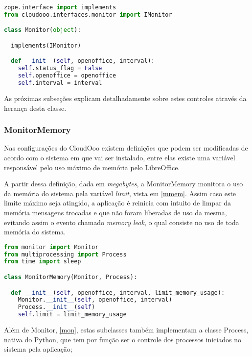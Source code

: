 {\singlespace
\begin{lstlisting}[caption=Inicialização da classe Monitor,language=python,label={monitor}]
zope.interface import implements
from cloudooo.interfaces.monitor import IMonitor

class Monitor(object):

  implements(IMonitor)

  def __init__(self, openoffice, interval):
    self.status_flag = False
    self.openoffice = openoffice
    self.interval = interval

\end{lstlisting}
}

As próximas subseções explicam detalhadamente sobre estes controles através da herança desta classe.

\subsubsection{MonitorMemory}
\label{monitormem}

Nas configurações do CloudOoo existem definições que podem ser modificadas de acordo com o sistema em que vai ser instalado, entre elas existe uma variável responsável pelo uso máximo de memória pelo LibreOffice.

A partir dessa definição, dada em \textit{megabytes}, a MonitorMemory monitora o uso da memória do sistema pela variável \textit{limit}, vista em \ref{mmem}. Assim caso este limite máximo seja atingido, a aplicação é reinicia com intuito de limpar da memória mensagens trocadas e que não foram liberadas de uso da mesma, evitando assim o evento chamado \textit{memory leak}, o qual consiste no uso de toda memória do sistema.

{\singlespace
\begin{lstlisting}[caption=Trecho de criação da classe MonitorMemory,language=python,label={mmem}]
from monitor import Monitor
from multiprocessing import Process
from time import sleep

class MonitorMemory(Monitor, Process):

  def __init__(self, openoffice, interval, limit_memory_usage):
    Monitor.__init__(self, openoffice, interval)
    Process.__init__(self)
    self.limit = limit_memory_usage
\end{lstlisting}
}

Além de Monitor, \ref{mon}, estas subclasses também implementam a classe Process, nativa do Python, que tem por função ser o controle dos processos iniciados no sistema pela aplicação;

